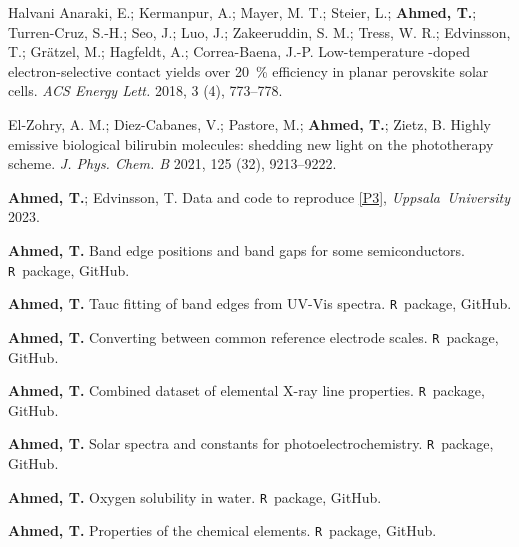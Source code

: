 \documentclass[webedition,openright,titles,swedish,english]{LuaUUThesis}\usepackage[]{graphicx}\usepackage[]{xcolor}
\newcommand{\R}{\texttt{R}}
\begin{document}
\renewcommand{\listofcontributionsname}{List of other scholarly contributions}
\listofcontributionsoutro{}
\begin{listofcontributions}
   \item \label{C1}
   Halvani Anaraki, E.; Kermanpur, A.; Mayer, M. T.; Steier, L.; \textbf{Ahmed, T.}; %
   Turren-Cruz, S.-H.; Seo, J.; Luo, J.; Zakeeruddin, S. M.; Tress, W. R.; %
   Edvinsson, T.; Grätzel, M.; Hagfeldt, A.; Correa-Baena, J.-P. %
   Low-temperature -doped  electron-selective contact yields %
   over \qty{20}{\percent} efficiency in planar perovskite solar cells. %
   \textit{ACS Energy Lett.} 2018, 3 (4), 773--778. %
   \item \label{C2}
   El-Zohry, A. M.; Diez-Cabanes, V.; Pastore, M.; \textbf{Ahmed, T.}; Zietz, B. %
   Highly emissive biological bilirubin molecules: shedding new light on %
   the phototherapy scheme. %
   \textit{J. Phys. Chem. B} 2021, 125 (32), 9213--9222. %
   \item \label{jpcc2020}
   \textbf{Ahmed, T.}; Edvinsson, T. Data and code to reproduce \cref{P3},
   \textit{Uppsala~University} 2023. %
   \item \label{bandgaps}
   \textbf{Ahmed, T.} Band edge positions and band gaps for some semiconductors. %
   \R~package, GitHub. %
   \item \label{uvvistauc}
   \textbf{Ahmed, T.} Tauc fitting of band edges from UV-Vis spectra. %
   \R~package, GitHub. %
   \item \label{refelectrodes}
   \textbf{Ahmed, T.} Converting between common reference electrode scales. %
   \R~package, GitHub. %
   \item \label{xraylines}
   \textbf{Ahmed, T.} Combined dataset of elemental X-ray line properties. %
   \R~package, GitHub. %
   \item \label{photoec}
   \textbf{Ahmed, T.} Solar spectra and constants for photoelectrochemistry. %
   \R~package, GitHub. %
   \item \label{O2solubilitywater}
   \textbf{Ahmed, T.} Oxygen solubility in water. \R~package, GitHub. %
   \item \label{periodicdata}
   \textbf{Ahmed, T.} Properties of the chemical elements. %
   \R~package, GitHub. %
\end{listofcontributions}
\end{document}
